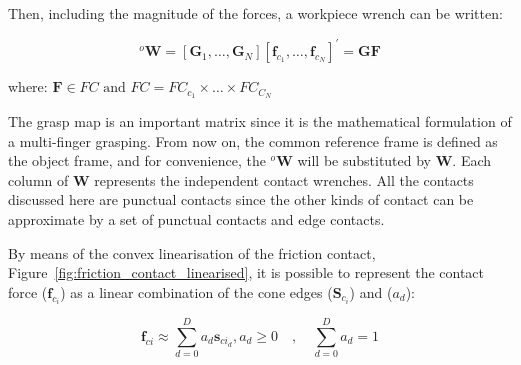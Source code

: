Then, including the magnitude of the forces, a workpiece wrench can be written:

\begin{equation}
^{o} \mathbf{W}=\left[\mathbf{G}_{1}, \ldots, \mathbf{G}_{N}\right]\left[\mathbf{f}_{c_1}, \ldots, \mathbf{f}_{c_N}\right]^{\prime}=\mathbf{G} \mathbf{F}
\end{equation}

\noindent
where: $\mathbf{F} \in F C \text { and } F C=F C_{c_1} \times \ldots \times F C_{C_N}$

The grasp map is an important matrix since it is the mathematical formulation of a multi-finger grasping. From now on, the common reference frame is defined as the object frame, and for convenience, the $^{o}\mathbf{W}$ will be substituted by $\mathbf{W}$. Each column of $\mathbf{W}$ represents the independent contact wrenches. All the contacts discussed here are punctual contacts since the other kinds of contact can be approximate by a set of punctual contacts and edge contacts.

By means of the convex linearisation of the friction contact, Figure~\ref{fig:friction_contact_linearised}, it is possible to represent the contact force ($\mathbf{f}_{c_i}$) as a linear combination of the cone edges ($\mathbf{S}_{c_i}$) and ($a_d$):

\begin{figure}[h!]
\end{figure}


\begin{equation}
	\mathbf{f}_{ci} \approx \sum_{d=0}^{D} a_{d} \mathbf{s}_{ci_d}, a_{d} \geq 0 \quad, \quad \sum_{d=0}^{D} a_{d}=1
\end{equation}

